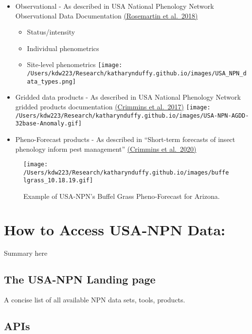 \documentclass[]{book}
\providecommand{\tightlist}{%
  \setlength{\itemsep}{0pt}\setlength{\parskip}{0pt}}
\begin{document}
\begin{itemize}
\tightlist
\item
  Observational - As described in USA National Phenology Network Observational Data Documentation \href{https://pubs.usgs.gov/of/2018/1060/ofr20181060.pdf}{(Rosemartin et al.~2018)}

  \begin{itemize}
  \tightlist
  \item
    Status/intensity
  \item
    Individual phenometrics
  \item
    Site-level phenometrics
    \texttt{[image: /Users/kdw223/Research/katharynduffy.github.io/images/USA\_NPN\_data\_types.png]}
  \end{itemize}
\item
  Gridded data products - As described in USA National Phenology Network gridded products documentation \href{https://pubs.usgs.gov/of/2017/1003/ofr20171003.pdf}{(Crimmins et al.~2017)}
  \texttt{[image: /Users/kdw223/Research/katharynduffy.github.io/images/USA-NPN-AGDD-32base-Anomaly.gif]}
\item
  Pheno-Forecast products - As described in ``Short-term forecasts of insect phenology inform pest management'' \href{https://academic.oup.com/aesa/article/113/2/139/5727873}{(Crimmins et al.~2020)}
\end{itemize}

\begin{figure}
\centering
\texttt{[image: /Users/kdw223/Research/katharynduffy.github.io/images/buffelgrass\_10.18.19.gif]}
\caption{Example of USA-NPN's Buffel Grass Pheno-Forecast for Arizona.}
\end{figure}

\hypertarget{how-to-access-usa-npn-data}{%
\section{How to Access USA-NPN Data:}\label{how-to-access-usa-npn-data}}

Summary here

\hypertarget{the-usa-npn-landing-page}{%
\subsection{The USA-NPN Landing page}\label{the-usa-npn-landing-page}}

A concise list of all available NPN data sets, tools, products.

\hypertarget{apis}{%
\subsection{APIs}\label{apis}}
\end{document}
